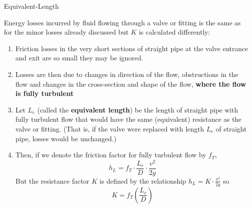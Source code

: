 \documentclass[9pt,xcolor={svgnames, x11names},professionalfonts, mathserif]{beamer}
\begin{document}
\begin{frame}{Equivalent-Length}

 Energy losses incurred by fluid flowing through a valve or fitting is the same as for the minor losses already
 discussed but $K$ is calculated differently:
 \begin{enumerate}
  \item Friction losses in the very short sections of straight pipe at the valve entrance and exit are so small they
        may be ignored.
  \item Losses are then due to changes in direction of the flow, obstructions in the flow and changes in the
        cross-section and shape of the flow, \textbf{where the flow is fully turbulent}
  \item Let $L_e$ (called the \textbf{equivalent length}) be the length of straight pipe with fully turbulent flow that
        would have the same (equivalent) resistance as the valve or fitting. (That is, if the valve were replaced with length $L_e$ of
        straight pipe, losses would be unchanged.)
  \item Then, if we denote the friction factor for fully turbulent flow by $f_T$,
        \[ h_L = f_T\cdot\frac{L_e}{D}\cdot\frac{v^2}{2g} \]
        But the resistance factor $K$ is defined by the relationship $\displaystyle h_L=K\cdot\frac{v^2}{2g}$ so
        \[ K=f_T\left(\frac{L_e}{D}\right) \]
 \end{enumerate}
\end{frame}
\end{document}
